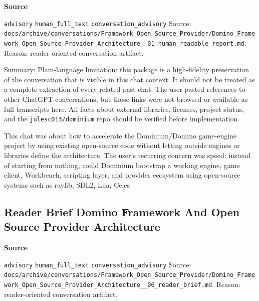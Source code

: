 \documentclass[9pt,a4paper,openany]{book}
\newcommand{\vonecallout}[3]{\par\medskip\noindent\begingroup\setlength{\fboxsep}{7pt}\colorbox{DomCalloutBg}{\parbox{0.94\linewidth}{\textbf{\textcolor{#1}{#2}}\par #3}}\endgroup\par\medskip}
\begin{document}
\vonecallout{DomSlate}{Source}{\texttt{advisory} \texttt{human\_\allowbreak{}full\_\allowbreak{}text} \texttt{conversation\_\allowbreak{}advisory} Source: \texttt{docs/\allowbreak{}archive/\allowbreak{}conversations/\allowbreak{}Framework\_\allowbreak{}Open\_\allowbreak{}Source\_\allowbreak{}Provider/\allowbreak{}Domino\_\allowbreak{}Framework\_\allowbreak{}Open\_\allowbreak{}Source\_\allowbreak{}Provider\_\allowbreak{}Architecture\_\allowbreak{}\_\allowbreak{}01\_\allowbreak{}human\_\allowbreak{}readable\_\allowbreak{}report.\allowbreak{}md}.\allowbreak{} Reason: reader-\allowbreak{}oriented conversation artifact.\allowbreak{}}

Summary: Plain-\allowbreak{}language limitation: this package is a high-\allowbreak{}fidelity preservation of the conversation that is visible in this chat context.\allowbreak{} It should not be treated as a complete extraction of every related past chat.\allowbreak{} The user pasted references to other ChatGPT conversations, but those links were not browsed or available as full transcripts here.\allowbreak{} All facts about external libraries, licenses, project status, and the \texttt{julesc013/\allowbreak{}dominium} repo should be verified before implementation.\allowbreak{}


This chat was about how to accelerate the Dominium/\allowbreak{}Domino game-\allowbreak{}engine project by using existing open-\allowbreak{}source code without letting outside engines or libraries define the architecture.\allowbreak{} The user's recurring concern was speed: instead of starting from nothing, could Dominium bootstrap a working engine, game client, Workbench, scripting layer, and provider ecosystem using open-\allowbreak{}source systems such as raylib, SDL2, Lua, Celes



\subsection{Reader Brief Domino Framework And Open Source Provider Architecture}

\vonecallout{DomSlate}{Source}{\texttt{advisory} \texttt{human\_\allowbreak{}full\_\allowbreak{}text} \texttt{conversation\_\allowbreak{}advisory} Source: \texttt{docs/\allowbreak{}archive/\allowbreak{}conversations/\allowbreak{}Framework\_\allowbreak{}Open\_\allowbreak{}Source\_\allowbreak{}Provider/\allowbreak{}Domino\_\allowbreak{}Framework\_\allowbreak{}Open\_\allowbreak{}Source\_\allowbreak{}Provider\_\allowbreak{}Architecture\_\allowbreak{}\_\allowbreak{}06\_\allowbreak{}reader\_\allowbreak{}brief.\allowbreak{}md}.\allowbreak{} Reason: reader-\allowbreak{}oriented conversation artifact.\allowbreak{}}
\end{document}
